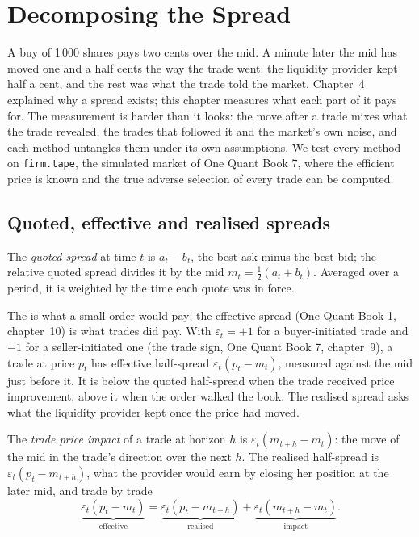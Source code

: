 \chapter{Decomposing the Spread}\label{ch:mx:decomposing-the-spread}

A buy of 1\,000 shares pays two cents over the mid. A minute later the mid has moved one and a half cents the way the trade went: the liquidity
provider kept half a cent, and the rest was what the trade told the market. Chapter~4 explained why a spread exists; this chapter measures what each
part of it pays for. The measurement is harder than it looks: the move after a trade mixes what the trade revealed, the trades that followed it and
the market's own noise, and each method untangles them under its own assumptions. We test every method on \texttt{firm.tape}, the simulated market of
One Quant Book 7, where the efficient price is known and the true adverse selection of every trade can be computed.

\section{Quoted, effective and realised spreads}

\begin{definition}\label{def:mx:decomposing-the-spread:quoted}
The \emph{quoted spread} at time $t$ is $a_t-b_t$, the best ask minus the best bid; the relative quoted spread divides it by the
mid $m_t=\tfrac12(a_t+b_t)$. Averaged over a period, it is weighted by the time each quote was in force.
\end{definition}

The  is what a small order would pay; the effective spread (One Quant Book 1, chapter~10) is what trades did pay. With $\varepsilon_t=+1$
for a buyer-initiated trade and $-1$ for a seller-initiated one (the trade sign, One Quant Book 7, chapter~9), a trade at price $p_t$ has effective
half-spread $\varepsilon_t(p_t-m_t)$, measured against the mid just before it. It is below the quoted half-spread when the trade received price
improvement, above it when the order walked the book. The realised spread asks what the liquidity provider kept once the price had moved.

\begin{definition}\label{def:mx:decomposing-the-spread:impact}
The \emph{trade price impact} of a trade at horizon $h$ is $\varepsilon_t(m_{t+h}-m_t)$: the move of the mid in the trade's
direction over the next $h$. The realised half-spread is $\varepsilon_t(p_t-m_{t+h})$, what the provider would earn by closing her position at the later
mid, and trade by trade
\[
\underbrace{\varepsilon_t(p_t-m_t)}_{\text{effective}}=\underbrace{\varepsilon_t(p_t-m_{t+h})}_{\text{realised}}+\underbrace{\varepsilon_t(m_{t+h}-m_t)}_{\text{impact}}.
\]
\end{definition}

